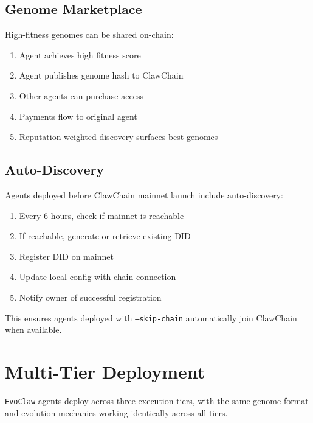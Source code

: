 \documentclass{article}
\newcommand{\evoclaw}{\texttt{EvoClaw}\xspace}
\begin{document}
\subsection{Genome Marketplace}

High-fitness genomes can be shared on-chain:

\begin{enumerate}[leftmargin=*]
    \item Agent achieves high fitness score
    \item Agent publishes genome hash to ClawChain
    \item Other agents can purchase access
    \item Payments flow to original agent
    \item Reputation-weighted discovery surfaces best genomes
\end{enumerate}

\subsection{Auto-Discovery}

Agents deployed before ClawChain mainnet launch include auto-discovery:

\begin{enumerate}[leftmargin=*]
    \item Every 6 hours, check if mainnet is reachable
    \item If reachable, generate or retrieve existing DID
    \item Register DID on mainnet
    \item Update local config with chain connection
    \item Notify owner of successful registration
\end{enumerate}

This ensures agents deployed with \texttt{--skip-chain} automatically join ClawChain when available.



\section{Multi-Tier Deployment}
\label{sec:deployment}

\evoclaw{} agents deploy across three execution tiers, with the same genome format and evolution mechanics working identically across all tiers.
\end{document}
